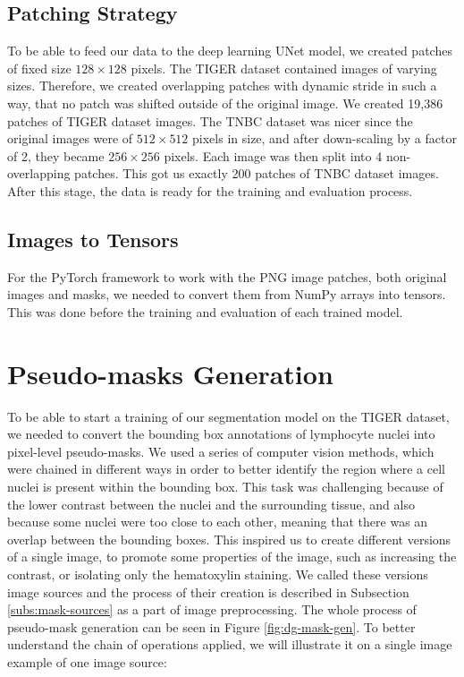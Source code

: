 \subsection{Patching Strategy}
To be able to feed our data to the deep learning UNet model, we created patches of fixed size $128\times128$ pixels. The TIGER dataset contained images of varying sizes. Therefore, we created overlapping patches with dynamic stride in such a way, that no patch was shifted outside of the original image. We created 19,386 patches of TIGER dataset images. The TNBC dataset was nicer since the original images were of $512\times512$ pixels in size, and after down-scaling by a factor of 2, they became $256\times256$ pixels. Each image was then split into 4 non-overlapping patches. This got us exactly 200 patches of TNBC dataset images. After this stage, the data is ready for the training and evaluation process.

\subsection{Images to Tensors}
For the PyTorch framework to work with the PNG image patches, both original images and masks, we needed to convert them from NumPy arrays into tensors. This was done before the training and evaluation of each trained model.

\section{Pseudo-masks Generation}
\label{section:mask-generation}
To be able to start a training of our segmentation model on the TIGER dataset, we needed to convert the bounding box annotations of lymphocyte nuclei into pixel-level pseudo-masks. We used a series of computer vision methods, which were chained in different ways in order to better identify the region where a cell nuclei is present within the bounding box. This task was challenging because of the lower contrast between the nuclei and the surrounding tissue, and also because some nuclei were too close to each other, meaning that there was an overlap between the bounding boxes. This inspired us to create different versions of a single image, to promote some properties of the image, such as increasing the contrast, or isolating only the hematoxylin staining. We called these versions image sources and the process of their creation is described in Subsection \ref{subs:mask-sources} as a part of image preprocessing. The whole process of pseudo-mask generation can be seen in Figure \ref{fig:dg-mask-gen}. To better understand the chain of operations applied, we will illustrate it on a single image example of one image source:

